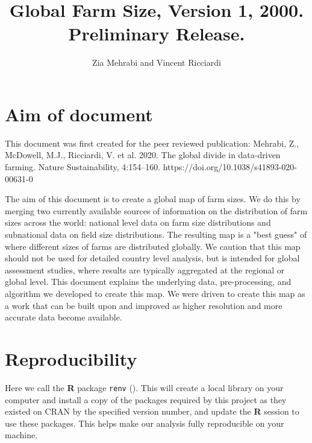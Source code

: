 \documentclass{article}
\title{Global Farm Size, Version 1, 2000. Preliminary Release.}
\author{Zia Mehrabi and Vincent Ricciardi}
\begin{document}





\maketitle

\tableofcontents

\newpage
\section{Aim of document}

This document was first created for the peer reviewed publication:
Mehrabi, Z., McDowell, M.J., Ricciardi, V. et al. 2020. The global divide in data-driven farming. Nature Sustainability, 4:154–160. https://doi.org/10.1038/s41893-020-00631-0


The aim of this document is to create a global map of farm sizes. We do this by merging two currently available sources of information on the distribution of farm sizes across the world: national level data on farm size distributions and subnational data on field size distributions. The resulting map is a "best guess" of where different sizes of farms are distributed globally. We caution that this map should not be used for detailed country level analysis, but is intended for global assessment studies, where results are typically aggregated at the regional or global level. This document explains the underlying data, pre-processing, and algorithm we developed to create this map. We were driven to create this map as a work that can be built upon and improved as higher resolution and more accurate data become available.

\section{Reproducibility}
\label{reproducibility}

Here we call the  \textbf{R} package \texttt{renv} (\cite{R-renv}). This will create a local library on your computer and install a copy of the packages required by this project as they existed on CRAN by the specified version number, and update the \textbf{R} session to use these packages. This helps make our analysis fully reproducible on your machine. 
\end{document}
